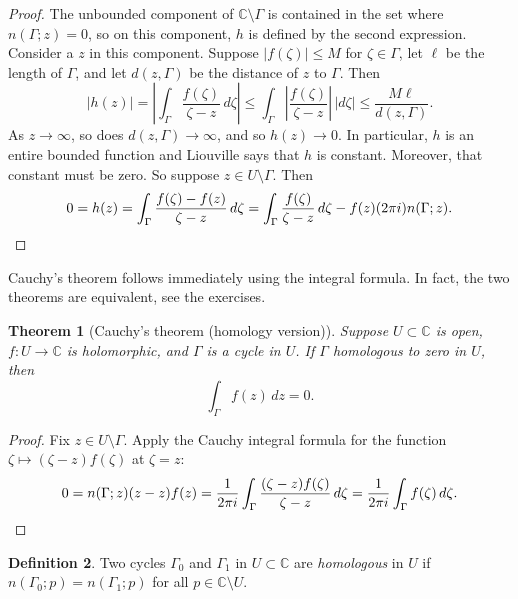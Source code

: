 \documentclass[12pt,openany]{book}
\newcommand{\sabs}[1]{\lvert {#1} \rvert}
\newcommand{\abs}[1]{\left\lvert {#1} \right\rvert}
\newcommand{\C}{{\mathbb{C}}}
\newcommand{\myindex}[1]{#1\index{#1}}
\theoremstyle{plain}
\newtheorem{thm}{Theorem}[section]
\theoremstyle{remark}
\theoremstyle{definition}
\newtheorem{defn}[thm]{Definition}
\theoremstyle{exercise}
\theoremstyle{example}
\begin{document}
\begin{proof}
The unbounded component of $\C \setminus \Gamma$ is contained in the
set where $n(\Gamma;z) = 0$, so on this component, $h$ is defined by the
second expression.  Consider a $z$ in this component.
Suppose $\sabs{f(\zeta)} \leq M$ for $\zeta \in \Gamma$, let $\ell$ be the length of
$\Gamma$, and let $d(z,\Gamma)$ be the distance of $z$ to $\Gamma$.  Then
\begin{equation*}
\sabs{h(z)}
=
\abs{
\int_\Gamma \frac{f(\zeta)}{\zeta-z} \, d\zeta
}
\leq
\int_\Gamma \abs{\frac{f(\zeta)}{\zeta-z}} \, \sabs{d\zeta}
\leq
\frac{M \ell}{d(z,\Gamma)} .
\end{equation*}
As $z \to \infty$, so does $d(z,\Gamma) \to \infty$, and so $h(z) \to 0$.
In particular, $h$ is an entire bounded function and
Liouville says that $h$ is constant. Moreover, that constant must be zero.
So suppose $z \in U \setminus \Gamma$.  Then
\begin{equation*}
0 = h(z) =
\int_\Gamma \frac{f(\zeta)-f(z)}{\zeta-z} \, d\zeta
=
\int_\Gamma \frac{f(\zeta)}{\zeta-z} \, d\zeta
-
f(z) (2\pi i) n(\Gamma;z) . \qedhere
\end{equation*}
\end{proof}

Cauchy's theorem follows immediately using the integral formula.
In fact, the two theorems are equivalent, see the exercises.

\begin{thm}[Cauchy's theorem (homology version)]
%
\label{thm:CThomology}%
Suppose $U \subset \C$ is open,
$f \colon U \to \C$ is holomorphic,
and $\Gamma$ is
a cycle
in $U$.
If $\Gamma$
homologous to zero in $U$,
then
\begin{equation*}
\int_\Gamma f(z) \, dz = 0 .
\end{equation*}
\end{thm}

\begin{proof}
Fix $z \in U \setminus \Gamma$.  Apply 
the Cauchy integral formula for the function $\zeta \mapsto
(\zeta-z)f(\zeta)$ at $\zeta=z$:
\begin{equation*}
0 = n(\Gamma;z) (z-z)f(z) =
\frac{1}{2\pi i} \int_\Gamma \frac{(\zeta-z)f(\zeta)}{\zeta-z} \, d\zeta
=
\frac{1}{2\pi i} \int_\Gamma f(\zeta) \, d\zeta . \qedhere
\end{equation*}
\end{proof}

\begin{defn}
Two cycles
$\Gamma_0$ and $\Gamma_1$ in $U
\subset \C$ are \emph{\myindex{homologous}} in $U$
if $n(\Gamma_0;p) = n(\Gamma_1;p)$ for all $p \in \C \setminus U$.
\end{defn}
\end{document}
